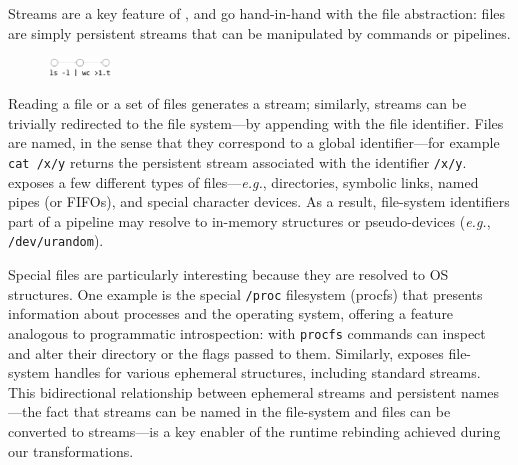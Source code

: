 \documentclass[sigplan,10pt,review,anonymous]{acmart}
\newcommand{\eg}{{\em e.g.}, }
\newcommand{\ttt}[1]{\texttt{\small #1}}
\begin{document}
Streams are a key feature of \unix, and go hand-in-hand with the file abstraction:
  files are simply persistent streams that can be manipulated by commands or pipelines.
\begin{figure}
  \vspace{-15pt}
    \includegraphics[width=0.15\textwidth]{./figs/dish_ex3.pdf}
  \vspace{-25pt}
\end{figure}
Reading a file or a set of files generates a stream; 
  similarly, streams can be trivially redirected to the file system---by appending with the file identifier.
Files are named, in the sense that they correspond to a global identifier---for example \ttt{cat /x/y} returns the persistent stream associated with the identifier \ttt{/x/y}.
\unix exposes a few different types of files---\eg directories, symbolic links, named pipes (or FIFOs), and special character devices.
As a result, file-system identifiers part of a pipeline may resolve to in-memory structures or pseudo-devices (\eg \ttt{/dev/urandom}).


Special files are particularly interesting because they are resolved to OS structures.
One example is the special \ttt{/proc} filesystem (procfs) that presents information about processes and the operating system, offering a feature analogous to programmatic introspection:
  with \ttt{procfs} commands can inspect and alter their directory or the flags passed to them.
Similarly, \unix exposes file-system handles for various ephemeral structures, including standard streams.
This bidirectional relationship between ephemeral streams and persistent names---the fact that streams can be named in the file-system and files can be converted to streams---is a key enabler of the runtime rebinding achieved during our transformations.
\end{document}
